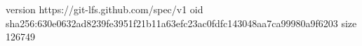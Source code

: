 version https://git-lfs.github.com/spec/v1
oid sha256:630e0632ad8239fe3951f21b11a63efc23ac0fdfc143048aa7ca99980a9f6203
size 126749
